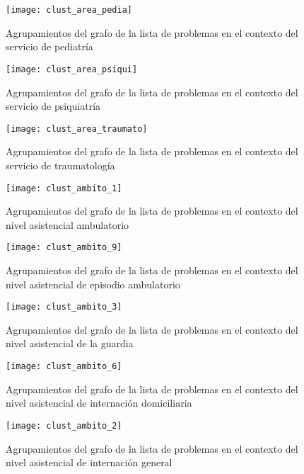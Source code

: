 \begin{figure}[ht]
\caption{Agrupamientos del grafo de la lista de problemas en el contexto del servicio de pediatría }
\label{fig:clust_area_pedia}
\centering
\texttt{[image: clust\_area\_pedia]}
\end{figure}

\begin{figure}[ht]
\caption{Agrupamientos del grafo de la lista de problemas en el contexto del servicio de psiquiatría }
\label{fig:clust_area_psiqui}
\centering
\texttt{[image: clust\_area\_psiqui]}
\end{figure}

\begin{figure}[ht]
\caption{Agrupamientos del grafo de la lista de problemas en el contexto del servicio de traumatología }
\label{fig:clust_area_traumato}
\centering
\texttt{[image: clust\_area\_traumato]}
\end{figure}

\begin{figure}[ht]
\caption{Agrupamientos del grafo de la lista de problemas en el contexto del nivel asistencial ambulatorio }
\label{fig:clust_ambito_ambulatorio}
\centering
\texttt{[image: clust\_ambito\_1]}
\end{figure}

\begin{figure}[ht]
\caption{Agrupamientos del grafo de la lista de problemas en el contexto del nivel asistencial de episodio ambulatorio }
\label{fig:clust_ambito_epi_ambulatorio}
\centering
\texttt{[image: clust\_ambito\_9]}
\end{figure}

\begin{figure}[ht]
\caption{Agrupamientos del grafo de la lista de problemas en el contexto del nivel asistencial de la guardia }
\label{fig:clust_ambito_guardia}
\centering
\texttt{[image: clust\_ambito\_3]}
\end{figure}

\begin{figure}[ht]
\caption{Agrupamientos del grafo de la lista de problemas en el contexto del nivel asistencial de internación domiciliaria }
\label{fig:clust_ambito_inter_domici}
\centering
\texttt{[image: clust\_ambito\_6]}
\end{figure}

\begin{figure}[ht]
\caption{Agrupamientos del grafo de la lista de problemas en el contexto del nivel asistencial de internación general }
\label{fig:clust_ambito_inter_general}
\centering
\texttt{[image: clust\_ambito\_2]}
\end{figure}

